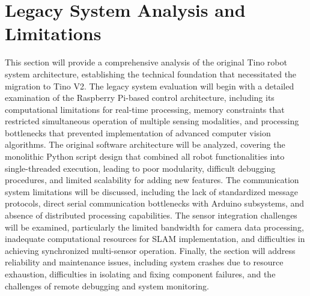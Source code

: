 \section{Legacy System Analysis and Limitations}
This section will provide a comprehensive analysis of the original Tino robot system architecture, establishing the technical foundation that necessitated the migration to Tino V2. The legacy system evaluation will begin with a detailed examination of the Raspberry Pi-based control architecture, including its computational limitations for real-time processing, memory constraints that restricted simultaneous operation of multiple sensing modalities, and processing bottlenecks that prevented implementation of advanced computer vision algorithms. The original software architecture will be analyzed, covering the monolithic Python script design that combined all robot functionalities into single-threaded execution, leading to poor modularity, difficult debugging procedures, and limited scalability for adding new features. The communication system limitations will be discussed, including the lack of standardized message protocols, direct serial communication bottlenecks with Arduino subsystems, and absence of distributed processing capabilities. The sensor integration challenges will be examined, particularly the limited bandwidth for camera data processing, inadequate computational resources for SLAM implementation, and difficulties in achieving synchronized multi-sensor operation. Finally, the section will address reliability and maintenance issues, including system crashes due to resource exhaustion, difficulties in isolating and fixing component failures, and the challenges of remote debugging and system monitoring.

